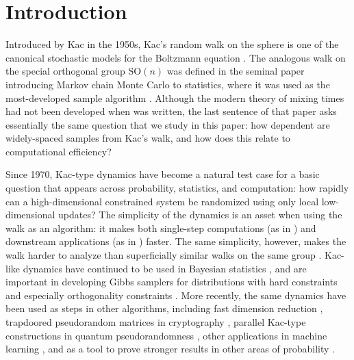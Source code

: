 \documentclass[11pt, reqno]{amsart}
\numberwithin{equation}{section}
\theoremstyle{remark}
\newcommand{\1}{\mathbf{1}}
\newcommand{\SO}{\mathrm{SO}}
\begin{document}
\section{Introduction}


Introduced by Kac in the 1950s, Kac's random walk on the sphere is one of the canonical stochastic models for the Boltzmann equation \cite{kac1956foundations,MischlerMouhot2013}. The analogous walk on the special orthogonal group $\SO(n)$ was defined in the seminal paper introducing Markov chain Monte Carlo to statistics, where it was used as the most-developed sample algorithm \cite{hastings70}. Although the modern theory of mixing times had not been developed when  \cite{hastings70} was written, the last sentence of that paper asks essentially the same question that we study in this paper: how dependent are widely-spaced samples from Kac's walk, and how does this relate to computational efficiency? 

Since 1970, Kac-type dynamics have become a natural test case for a basic question that appears across probability, statistics, and computation: how rapidly can a high-dimensional constrained system be randomized using only local low-dimensional updates? 
The simplicity of the dynamics is an asset when using the walk as an algorithm: it makes both single-step computations (as in \cite{hastings70}) and downstream applications (as in \cite{sotirakitrap,JainPillaiSahSawhneySmith2022,VaikuntanathanZamir2025}) faster. The same simplicity, however, makes the walk harder to analyze than superficially similar walks on the same group \cite{HoughJiang,Porod,Rosenthal}. Kac-like dynamics have continued to be used in Bayesian statistics \cite{bornn2019moment}, and are important in developing Gibbs samplers for distributions with hard constraints \cite{Oliveira,PillaiSmith} and especially orthogonality constraints \cite{JauchHoffDunson2020}. More recently, the same dynamics have been used as steps in other algorithms, including fast dimension reduction \cite{AilonChazelle06,JainPillaiSahSawhneySmith2022}, trapdoored pseudorandom matrices in cryptography \cite{sotirakitrap}, parallel Kac-type constructions in quantum pseudorandomness \cite{LuQinSongYaoZhao2024,LuQinSongYaoZhao2025}, other applications in machine learning \cite{VaikuntanathanZamir2025}, and as a tool to prove stronger results in other areas of probability \cite{NgWalters15}.
\end{document}
